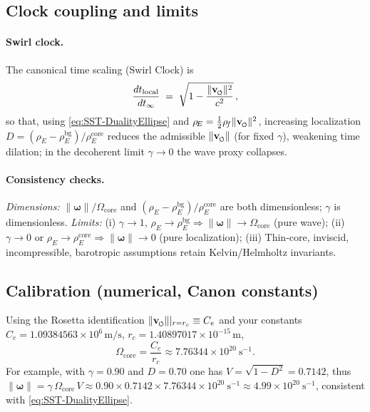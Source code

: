 \documentclass[10pt,reprint,aps,onecolumn,nofootinbib]{revtex4-2}
\newcommand{\vnorm}{\lVert \mathbf{v}_{\mkern-2mu\scriptscriptstyle\boldsymbol{\circlearrowleft}} \rVert}               %
\newcommand{\rhoE}{\rho_{\!E}}                           %
\newcommand{\rc}{r_c}                                    %
\providecommand{\rc}{r_c}
\newcommand{\omegaVec}{\boldsymbol{\omega}}
\newcommand{\rhoF}{\rho_{\!f}}     %
\newcommand{\OmegaCore}{\Omega_{\mathrm{core}}}
\newcommand{\bg}{\mathrm{bg}}
\newcommand{\core}{\mathrm{core}}
\begin{document}
    \subsection{Clock coupling and limits}
    \label{subsec:Clock-Limits}

    \paragraph{Swirl clock.}
        The canonical time scaling (Swirl Clock) is
        \begin{equation}
            \frac{dt_{\text{local}}}{dt_{\infty}}
            \;=\;\sqrt{1-\frac{\vnorm^{2}}{c^{2}}}\,,
        \end{equation}
        so that, using \eqref{eq:SST-DualityEllipse} and $\rhoE=\tfrac12\rhoF\vnorm^2$,
        increasing localization $D=(\rhoE-\rhoE^{\bg})/\rhoE^{\core}$ reduces the admissible $\vnorm$
        (for fixed $\gamma$), weakening time dilation; in the decoherent limit $\gamma\to0$ the wave proxy collapses.

    \paragraph{Consistency checks.}
        \emph{Dimensions:} $\lVert\omegaVec\rVert/\OmegaCore$ and $(\rhoE-\rhoE^{\bg})/\rhoE^{\core}$ are both dimensionless; $\gamma$ is dimensionless.
        \emph{Limits:}
        (i) $\gamma\to1$, $\rhoE\to\rhoE^{\bg}\Rightarrow \lVert\omegaVec\rVert\to\OmegaCore$ (pure wave);
        (ii) $\gamma\to0$ or $\rhoE\!\to\!\rhoE^{\core}\Rightarrow \lVert\omegaVec\rVert\to0$ (pure localization);
        (iii) Thin-core, inviscid, incompressible, barotropic assumptions retain Kelvin/Helmholtz invariants.

    \subsection{Calibration (numerical, Canon constants)}
    \label{subsec:Calibration-DE}

    Using the Rosetta identification $\vnorm|_{r=\rc}\equiv C_e$ and your constants
    $C_e=1.09384563\times10^{6}\,\mathrm{m/s}$, $\rc=1.40897017\times10^{-15}\,\mathrm{m}$,
    \begin{equation}
        \OmegaCore=\frac{C_e}{\rc} \approx 7.76344\times10^{20}\ \mathrm{s}^{-1}.
    \end{equation}
    For example, with $\gamma=0.90$ and $D=0.70$ one has
    $V=\sqrt{1-D^{2}}=0.7142$, thus $\lVert\omegaVec\rVert=\gamma\,\OmegaCore\,V\approx
    0.90\times 0.7142\times 7.76344\times10^{20}\ \mathrm{s}^{-1}\approx 4.99\times10^{20}\ \mathrm{s}^{-1}$,
    consistent with \eqref{eq:SST-DualityEllipse}.
\end{document}
